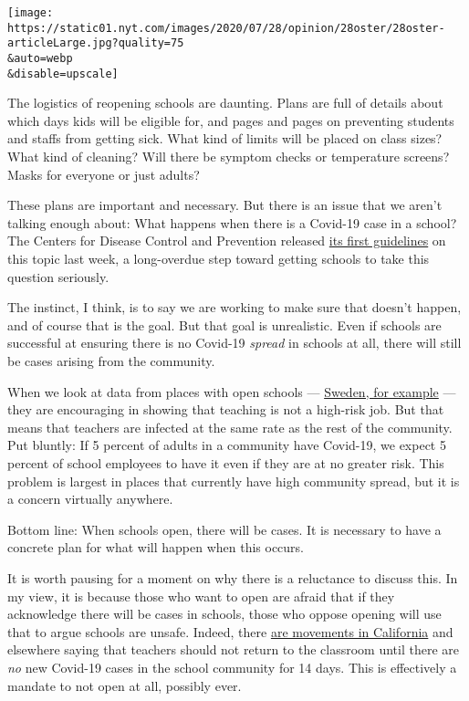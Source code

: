 \texttt{[image: https://static01.nyt.com/images/2020/07/28/opinion/28oster/28oster-articleLarge.jpg?quality=75\\\&auto=webp\\\&disable=upscale]}

The logistics of reopening schools are daunting. Plans are full of
details about which days kids will be eligible for, and pages and pages
on preventing students and staffs from getting sick. What kind of limits
will be placed on class sizes? What kind of cleaning? Will there be
symptom checks or temperature screens? Masks for everyone or just
adults?

These plans are important and necessary. But there is an issue that we
aren't talking enough about: What happens when there is a Covid-19 case
in a school? The Centers for Disease Control and Prevention released
\href{https://www.cdc.gov/coronavirus/2019-ncov/community/schools-childcare/prepare-safe-return.html}{its
first guidelines} on this topic last week, a long-overdue step toward
getting schools to take this question seriously.

The instinct, I think, is to say we are working to make sure that
doesn't happen, and of course that is the goal. But that goal is
unrealistic. Even if schools are successful at ensuring there is no
Covid-19 \emph{spread} in schools at all, there will still be cases
arising from the community.

When we look at data from places with open schools ---
\href{https://www.bloomberg.com/news/articles/2020-07-19/covid-s-spread-in-schools-is-questioned-in-latest-nordic-study}{Sweden,
for example} --- they are encouraging in showing that teaching is not a
high-risk job. But that means that teachers are infected at the same
rate as the rest of the community. Put bluntly: If 5 percent of adults
in a community have Covid-19, we expect 5 percent of school employees to
have it even if they are at no greater risk. This problem is largest in
places that currently have high community spread, but it is a concern
virtually anywhere.

Bottom line: When schools open, there will be cases. It is necessary to
have a concrete plan for what will happen when this occurs.

It is worth pausing for a moment on why there is a reluctance to discuss
this. In my view, it is because those who want to open are afraid that
if they acknowledge there will be cases in schools, those who oppose
opening will use that to argue schools are unsafe. Indeed, there
\href{https://www.facebook.com/refusetoreturn/}{are movements in
California} and elsewhere saying that teachers should not return to the
classroom until there are \emph{no} new Covid-19 cases in the school
community for 14 days. This is effectively a mandate to not open at all,
possibly ever.

